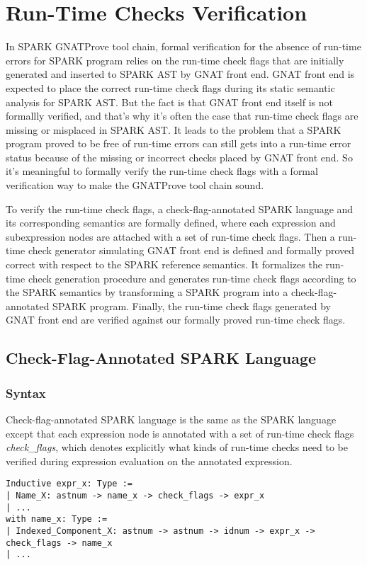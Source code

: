 \section{Run-Time Checks Verification}
In SPARK GNATProve tool chain, formal verification for the absence of run-time
errors for SPARK program relies on the run-time check flags that are initially
generated and inserted to SPARK AST by GNAT front end. GNAT front end is
expected to place the correct run-time check flags during its static semantic
analysis for SPARK AST. But the fact is that GNAT front end itself is not
formallly verified, and that's why it's often the case that run-time check flags
are missing or misplaced in SPARK AST. It leads to the problem that a SPARK
program proved to be free of run-time errors can still gets into a run-time
error status because of the missing or incorrect checks placed by GNAT front
end. So it's meaningful to formally verify the run-time check flags with a
formal verification way to make the GNATProve tool chain sound.

To verify the run-time check flags, a check-flag-annotated SPARK language
and its corresponding semantics are formally defined, where each expression and
subexpression nodes are attached with a set of run-time check flags. Then a
run-time check generator simulating GNAT front end is defined and formally
proved correct with respect to the SPARK reference semantics. It formalizes the
run-time check generation procedure and generates run-time check flags according
to the SPARK semantics by transforming a SPARK program into a
check-flag-annotated SPARK program. Finally, the run-time check flags generated
by GNAT front end are verified against our formally proved run-time check flags.

\subsection{Check-Flag-Annotated SPARK Language}
\subsubsection{Syntax}
Check-flag-annotated SPARK language is the same as the SPARK language except
that each expression node is annotated with a set of run-time check flags
\textit{check\_flags}, which denotes explicitly what kinds of run-time checks
need to be verified during expression evaluation on the annotated expression.

\begin{lstlisting}[escapechar=\#, language=coq, basicstyle=\scriptsize]
Inductive expr_x: Type :=  
| Name_X: astnum -> name_x -> check_flags -> expr_x 
| ...
with name_x: Type := 
| Indexed_Component_X: astnum -> astnum -> idnum -> expr_x -> check_flags -> name_x 
| ...
\end{lstlisting}

